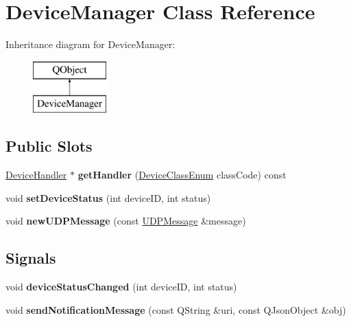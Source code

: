 \hypertarget{class_device_manager}{}\section{Device\+Manager Class Reference}
\label{class_device_manager}
Inheritance diagram for Device\+Manager\+:\begin{figure}[H]
\begin{center}
\leavevmode
\includegraphics[height=2.000000cm]{class_device_manager}
\end{center}
\end{figure}
\subsection*{Public Slots}
\begin{DoxyCompactItemize}
\item 
\mbox{\label{class_device_manager_a693a3a80d7cefeaabbc29fd8695f9e1a}} 
\hyperlink{class_device_handler}{Device\+Handler} $\ast$ {\bfseries get\+Handler} (\hyperlink{_global_defs_8h_ad17679fac69973be9b3a2787a60d7722}{Device\+Class\+Enum} class\+Code) const
\item 
\mbox{\label{class_device_manager_a037575d38c8aa473d57de2950e0daa18}} 
void {\bfseries set\+Device\+Status} (int device\+ID, int status)
\item 
\mbox{\label{class_device_manager_aa231eea3b24b3418482506be4b7d02ef}} 
void {\bfseries new\+U\+D\+P\+Message} (const \hyperlink{class_u_d_p_message}{U\+D\+P\+Message} \&message)
\end{DoxyCompactItemize}
\subsection*{Signals}
\begin{DoxyCompactItemize}
\item 
\mbox{\label{class_device_manager_aa96a714f5d7b0a43c5b37622df5f4800}} 
void {\bfseries device\+Status\+Changed} (int device\+ID, int status)
\item 
\mbox{\label{class_device_manager_a2b8369554a4720f18d7ab3aef8a847ec}} 
void {\bfseries send\+Notification\+Message} (const Q\+String \&uri, const Q\+Json\+Object \&obj)
\end{DoxyCompactItemize}

